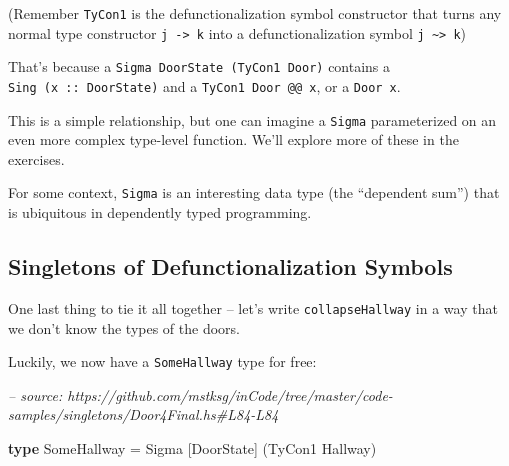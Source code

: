 \documentclass[]{article}
\newenvironment{Shaded}{}{}
\newcommand{\CommentTok}[1]{\textcolor[rgb]{0.38,0.63,0.69}{\textit{#1}}}
\newcommand{\DataTypeTok}[1]{\textcolor[rgb]{0.56,0.13,0.00}{#1}}
\newcommand{\FunctionTok}[1]{\textcolor[rgb]{0.02,0.16,0.49}{#1}}
\newcommand{\KeywordTok}[1]{\textcolor[rgb]{0.00,0.44,0.13}{\textbf{#1}}}
\newcommand{\NormalTok}[1]{#1}
\newcommand{\OtherTok}[1]{\textcolor[rgb]{0.00,0.44,0.13}{#1}}
\begin{document}
\begin{Shaded}
\end{Shaded}

(Remember \texttt{TyCon1} is the defunctionalization symbol constructor that
turns any normal type constructor \texttt{j\ -\textgreater{}\ k} into a
defunctionalization symbol \texttt{j\ \textasciitilde{}\textgreater{}\ k})

That's because a \texttt{Sigma\ DoorState\ (TyCon1\ Door)} contains a
\texttt{Sing\ (x\ ::\ DoorState)} and a \texttt{TyCon1\ Door\ @@\ x}, or a
\texttt{Door\ x}.

This is a simple relationship, but one can imagine a \texttt{Sigma}
parameterized on an even more complex type-level function. We'll explore more of
these in the exercises.

For some context, \texttt{Sigma} is an interesting data type (the ``dependent
sum'') that is ubiquitous in dependently typed programming.

\hypertarget{singletons-of-defunctionalization-symbols}{%
\subsection{Singletons of Defunctionalization
Symbols}\label{singletons-of-defunctionalization-symbols}}

One last thing to tie it all together -- let's write \texttt{collapseHallway} in
a way that we don't know the types of the doors.

Luckily, we now have a \texttt{SomeHallway} type for free:

\begin{Shaded}
\begin{Highlighting}[]
\CommentTok{-- source: https://github.com/mstksg/inCode/tree/master/code-samples/singletons/Door4Final.hs#L84-L84}

\KeywordTok{type} \DataTypeTok{SomeHallway} \FunctionTok{=} \DataTypeTok{Sigma}\NormalTok{ [}\DataTypeTok{DoorState}\NormalTok{] (}\DataTypeTok{TyCon1} \DataTypeTok{Hallway}\NormalTok{)}
\end{Highlighting}
\end{Shaded}
\end{document}
